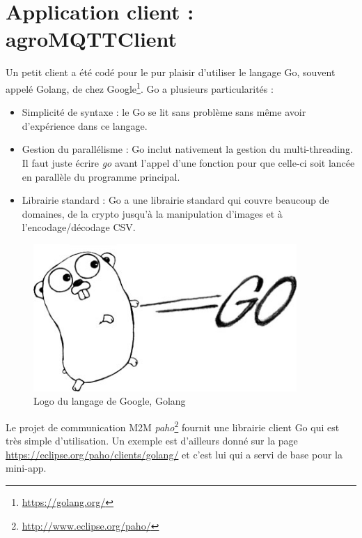 \newpage
\section{Application client : agroMQTTClient}
Un petit client a été codé pour le pur plaisir d'utiliser le langage Go, souvent appelé Golang, de chez Google\footnote{\url{https://golang.org/}}. Go a plusieurs particularités : 
\begin{itemize}
	\item Simplicité de syntaxe : le Go se lit sans problème sans même avoir d'expérience dans ce langage.
	\item Gestion du parallélisme : Go inclut nativement la gestion du multi-threading. Il faut juste écrire \textit{go} avant l'appel d'une fonction pour que celle-ci soit lancée en parallèle du programme principal.
	\item Librairie standard : Go a une librairie standard qui couvre beaucoup de domaines,  de la crypto jusqu'à la manipulation d'images et à l'encodage/décodage CSV. 
\end{itemize}

\begin{figure}[H]
	\begin{center}
		\includegraphics[width=10cm]{img/google-go-logo.jpg}
		\caption{Logo du langage de Google, Golang}
		\label{golang}
	\end{center}
\end{figure}

Le projet de communication M2M \textit{paho}\footnote{\url{http://www.eclipse.org/paho/}} fournit une librairie client Go qui est très simple d'utilisation. Un exemple est d'ailleurs donné sur la page \url{https://eclipse.org/paho/clients/golang/} et c'est lui qui a servi de base pour la mini-app. \\

